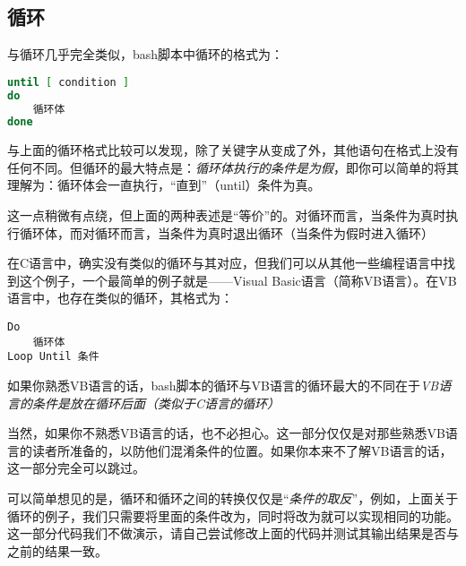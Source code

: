 \subsection{循环}\label{subsec:循环-until循环}

与循环几乎完全类似，bash脚本中循环的格式为：

\begin{lstlisting}[language=bash]
until [ condition ]
do
    循环体
done
\end{lstlisting}

与上面的循环格式比较可以发现，除了关键字从变成了外，其他语句在格式上没有任何不同。但循环的最大特点是：\emph{循环体执行的条件是为假}，即你可以简单的将其理解为：循环体会一直执行，“直到”（until）条件为真。

\begin{attention}
    这一点稍微有点绕，但上面的两种表述是“等价”的。对循环而言，当条件为真时执行循环体，而对循环而言，当条件为真时退出循环（当条件为假时进入循环）
\end{attention}

\begin{extend}
    在C语言中，确实没有类似的循环与其对应，但我们可以从其他一些编程语言中找到这个例子，一个最简单的例子就是——Visual Basic语言（简称VB语言）。在VB语言中，也存在类似的循环，其格式为：

    \begin{lstlisting}
Do 
    循环体
Loop Until 条件
    \end{lstlisting}

    如果你熟悉VB语言的话，bash脚本的循环与VB语言的循环最大的不同在于\emph{VB语言的条件是放在循环后面（类似于C语言的循环）}

    当然，如果你不熟悉VB语言的话，也不必担心。这一部分仅仅是对那些熟悉VB语言的读者所准备的，以防他们混淆条件的位置。如果你本来不了解VB语言的话，这一部分完全可以跳过。
\end{extend}

可以简单想见的是，循环和循环之间的转换仅仅是“\emph{条件的取反}”，例如，上面关于循环的例子，我们只需要将里面的条件改为，同时将改为就可以实现相同的功能。这一部分代码我们不做演示，请自己尝试修改上面的代码并测试其输出结果是否与之前的结果一致。






